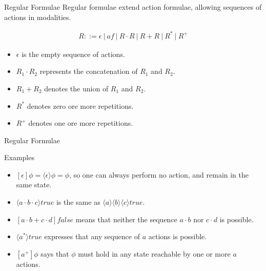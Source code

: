 \documentclass{beamer}
\begin{document}
  \begin{frame}{Regular Formulae}
    Regular formulae extend action formulae, allowing sequences of actions in modalities.

    \begin{align*}
      R ::= \epsilon\ |\ af\ |\ R\cdot{R}\ |\ R+R\ |\ R^*\ |\ R^+
    \end{align*}

    \begin{itemize}
      \item $\epsilon$ is the empty sequence of actions.
      \item $R_1\cdot{R_2}$ represents the concatenation of $R_1$ and $R_2$.
      \item $R_1+R_2$ denotes the union of  $R_1$ and $R_2$.
      \item $R^*$ denotes zero ore more repetitions.
      \item $R^+$ denotes one ore more repetitions.
    \end{itemize}
  \end{frame}

  \begin{frame}{Regular Formulae}
    \begin{exampleblock}{Examples}
      \begin{itemize}
        \item $[\epsilon]\phi = \langle\epsilon\rangle\phi = \phi$, so one can always perform no action, and remain in the same state.
        \item $\langle{a}\cdot{b}\cdot{c}\rangle{true}$ is the same as $\langle{a}\rangle\langle{b}\rangle\langle{c}\rangle{true}$.
        \item $[a\cdot{b} + c\cdot{d}]false$ means that neither the sequence $a\cdot{b}$ nor $c\cdot{d}$ is possible.
        \item $\langle{a^*}\rangle{true}$ expresses that any sequence of $a$ actions is possible.
        \item $[a^+]\phi$ says that $\phi$ must hold in any state reachable by one or more $a$ actions.
      \end{itemize}
    \end{exampleblock}
  \end{frame}
\end{document}
